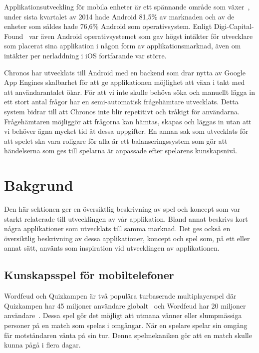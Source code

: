 \documentclass[a4paper, 11pt]{article}
\begin{document}
Applikationsutveckling för mobila enheter är ett spännande område som växer~\cite{IDC}, under sista kvartalet av 2014 hade Android 81,5\% av marknaden och av de enheter som såldes hade 76,6\% Android som operativsystem. Enligt Digi-Capital-Found~\cite{revenue} var även Android operativsystemet som gav högst intäkter för utvecklare som placerat sina applikation i någon form av applikationsmarknad, även om intäkter per nerladdning i iOS fortfarande var större.

Chronos har utvecklats till Android med en backend som drar nytta av Google App Engines skalbarhet för att ge applikationen möjlighet att växa i takt med att användarantalet ökar. För att vi inte skulle behöva söka och manuellt lägga in ett stort antal frågor har en semi-automatisk frågehämtare utvecklats. Detta system bidrar till att Chronos inte blir repetitivt och tråkigt för användarna. Frågehämtaren möjliggör att frågorna kan hämtas, skapas och läggas in utan att vi behöver ägna mycket tid åt dessa uppgifter. En annan sak som utvecklats för att spelet ska vara roligare för alla är ett balanseringssystem som gör att händelserna som ges till spelarna är anpassade efter spelarens kunskapsnivå.


\section{Bakgrund}
Den här sektionen ger en översiktlig beskrivning av spel och koncept som var starkt relaterade till utvecklingen av vår applikation. Bland annat beskrivs kort några applikationer som utvecklats till samma marknad. Det ges också en översiktlig beskrivning av dessa applikationer, koncept och spel som, på ett eller annat sätt, använts som inspiration vid utvecklingen av applikationen. 

\subsection{Kunskapsspel för mobiltelefoner}
Wordfeud och Quizkampen är två populära turbaserade multiplayerspel där Quizkampen har 45 miljoner användare globalt~\cite{quiz} och Wordfeud har 20 miljoner användare~\cite{wordfeud}. Dessa spel gör det möjligt att utmana vänner eller slumpmässiga personer på en match som spelas i omgångar. När en spelare spelar sin omgång får motståndaren vänta på sin tur. Denna spelmekaniken gör att en match skulle kunna pågå i flera dagar.
\end{document}
